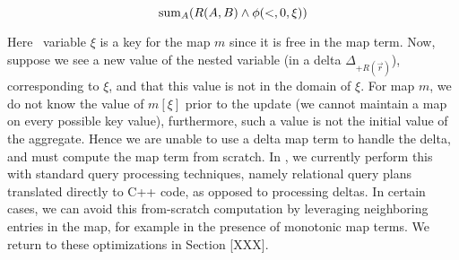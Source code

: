 \[\mathrm{sum}_{A}(R(A,B)\wedge \phi(<, 0, \xi))\]


Here \bigsum\ variable $\xi$ is a key for the map $m$ since it is free in the
map term.
Now, suppose we see a new value of the nested variable (in a delta
$\Delta_{+R(\vec{r})}$), corresponding to $\xi$, and that this value is not in
the domain of $\xi$. For map $m$, we do not know the value of $m[\xi]$ prior to
the update (we cannot maintain a map on every possible key value), furthermore,
such a value is not the initial value of the aggregate. Hence we are unable to
use a delta map term to handle the delta, and must compute the map term from
scratch. In \compiler, we currently perform this with standard query processing
techniques, namely relational query plans translated directly to C++ code, as
opposed to processing deltas. In certain cases, we can avoid this from-scratch
computation by leveraging neighboring entries in the map, for example in the
presence of monotonic map terms. We return to these optimizations in Section
[XXX].


